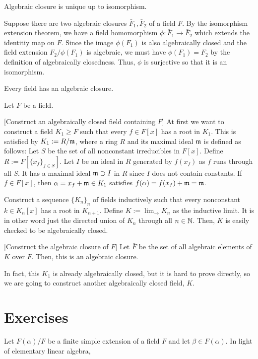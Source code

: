\documentclass{../note}
\begin{document}
\begin{prb}
Algebraic closure is unique up to isomorphism.
\end{prb}
\begin{pf}
Suppose there are two algebraic closures $\bar F_1, \bar F_2$ of a field $F$.
By the isomorphism extension theorem, we have a field homomorphism $\phi:\bar F_1\to\bar F_2$ which extends the identitiy map on $F$.
Since the image $\phi(F_1)$ is also algebraically closed and the field extension $F_2/\phi(F_1)$ is algebraic, we must have $\phi(F_1)=F_2$ by the definition of algebraically closedness.
Thus, $\phi$ is surjective so that it is an isomorphism.
\end{pf}

\begin{prb}
Every field has an algebraic closure.
\end{prb}
\begin{pf}
Let $F$ be a field.

[Construct an algebraically closed field containing $F$]
At first we want to construct a field $K_1\ge F$ such that every $f\in F[x]$ has a root in $K_1$.
This is satisfied by $K_1:=R/\mathfrak{m}$, where a ring $R$ and its maximal ideal $\mathfrak{m}$ is defined as follows:
Let $S$ be the set of all nonconstant irreducibles in $F[x]$.
Define $R:=F[\{x_f\}_{f\in S}]$.
Let $I$ be an ideal in $R$ generated by $f(x_f)$ as $f$ runs through all $S$.
It has a maximal ideal $\mathfrak{m}\supset I$ in $R$ since $I$ does not contain constants.
If $f\in F[x]$, then $\alpha=x_f+\mathfrak{m}\in K_1$ satisfies $f(\alpha)=f(x_f)+\mathfrak{m}=\mathfrak{m}$.

Construct a sequence $\{K_n\}_n$ of fields inductively such that every nonconstant $k\in K_n[x]$ has a root in $K_{n+1}$.
Define $K:=\lim_{\to}K_n$ as the inductive limit.
It is in other word just the directed union of $K_n$ through all $n\in\mathbb{N}$.
Then, $K$ is easily checked to be algebraically closed.

[Construct the algebraic closure of $F$]
Let $\bar F$ be the set of all algebraic elements of $K$ over $F$.
Then, this is an algebraic closure.
\end{pf}
\begin{rmk}
In fact, this $K_1$ is already algebraically closed, but it is hard to prove directly, so we are going to construct another algebraically closed field, $K$.
\end{rmk}




\section*{Exercises}
\begin{prb}
Let $F(\alpha)/F$ be a finite simple extension of a field $F$ and let $\beta\in F(\alpha)$.
In light of elementary linear algebra,
\end{prb}
\end{document}
